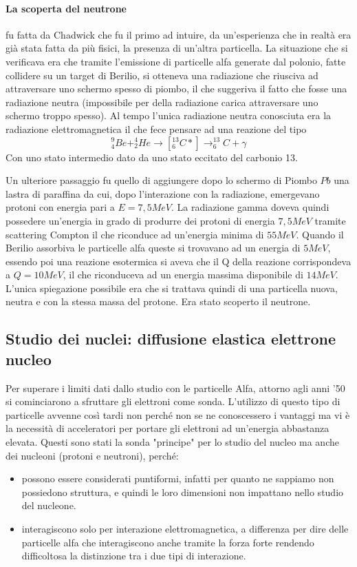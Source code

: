 \paragraph{La scoperta del neutrone} fu fatta da Chadwick che fu il primo ad intuire, da un'esperienza che in realtà era già stata fatta da più fisici, la presenza di un'altra particella. 
La situazione che si verificava era che tramite l'emissione di particelle alfa generate dal polonio, fatte collidere su un target di Berilio, si otteneva una radiazione che riusciva ad attraversare uno schermo spesso di piombo, il che suggeriva il fatto che fosse una radiazione neutra (impossibile per della radiazione carica attraversare uno schermo troppo spesso). 
Al tempo l'unica radiazione neutra conosciuta era la radiazione elettromagnetica il che fece pensare ad una reazione del tipo
\[
^9_4Be+^4_2He\longrightarrow[^{13}_6C*]\longrightarrow^{13}_6C+\gamma
\]
Con uno stato intermedio dato da uno stato eccitato del carbonio 13.

Un ulteriore passaggio fu quello di aggiungere dopo lo schermo di Piombo $Pb$ una lastra di paraffina da cui, dopo l'interazione con la radiazione, emergevano protoni con energia pari a $E=7,5MeV$. 
La radiazione gamma doveva quindi possedere un'energia in grado di produrre dei protoni di energia $7,5MeV$ tramite scattering Compton il che riconduce ad un'energia minima di $55MeV$.
Quando il Berilio assorbiva le particelle alfa queste si trovavano ad un energia di $5MeV$, essendo poi una reazione esotermica si aveva che il Q della reazione corrispondeva a $Q=10MeV$, il che riconduceva ad un energia massima disponibile di $14MeV$.
L'unica spiegazione possibile era che si trattava quindi di una particella nuova, neutra e con la stessa massa del protone.
Era stato scoperto il neutrone.

\subsection{Studio dei nuclei: diffusione elastica elettrone nucleo}
Per superare i limiti dati dallo studio con le particelle Alfa, attorno agli anni '50 si cominciarono a sfruttare gli elettroni come sonda.
L'utilizzo di questo tipo di particelle avvenne così tardi non perché non se ne conoscessero i vantaggi ma vi è la necessità di acceleratori per portare gli elettroni ad un'energia abbastanza elevata.
Questi sono stati la sonda "principe" per lo studio del nucleo ma anche dei nucleoni (protoni e neutroni), perché:
\begin{itemize}
\item possono essere considerati puntiformi, infatti per quanto ne sappiamo non possiedono struttura, e quindi le loro dimensioni non impattano nello studio del nucleone.
\item interagiscono solo per interazione elettromagnetica, a differenza per dire delle particelle alfa che interagiscono anche tramite la forza forte rendendo difficoltosa la distinzione tra i due tipi di interazione.
\end{itemize}


